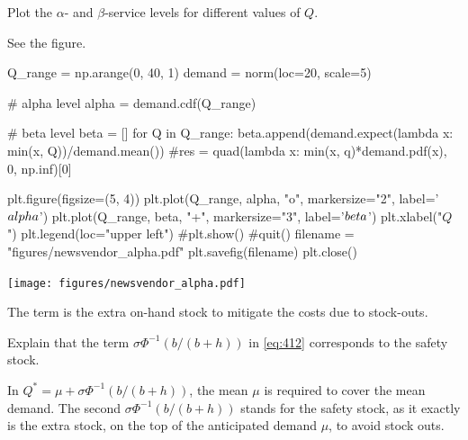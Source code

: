 \begin{exercise}[Continuation]
Plot the $\alpha$- and $\beta$-service levels for different values of $Q$.
\begin{solution}
See the figure.

\begin{pycode}[news]
Q_range = np.arange(0, 40, 1)
demand = norm(loc=20, scale=5)

# alpha level
alpha = demand.cdf(Q_range)

# beta level 
beta = []
for Q in Q_range:
    beta.append(demand.expect(lambda x: min(x, Q))/demand.mean())
    #res = quad(lambda x: min(x, q)*demand.pdf(x), 0, np.inf)[0]


plt.figure(figsize=(5, 4))
plt.plot(Q_range, alpha, "o", markersize="2", label='$\\alpha$')
plt.plot(Q_range, beta, "+", markersize="3", label='$\\beta$')
plt.xlabel("$Q$")
plt.legend(loc="upper left")
#plt.show()
#quit()
filename = "figures/newsvendor_alpha.pdf"
plt.savefig(filename)
plt.close()
\end{pycode}

\begin{center}
\texttt{[image: figures/newsvendor\_alpha.pdf]}
\end{center}
\end{solution}
\end{exercise}


The term  is the extra on-hand stock to mitigate the costs due to stock-outs. 

\begin{exercise}
Explain that the term $\sigma \Phi^{-1}(b/(b+h))$ in \eqref{eq:412} corresponds to the  safety stock.
\begin{solution}
In $Q^* = \mu + \sigma \Phi^{-1}(b/(b+h))$, the mean $\mu$ is required to cover the mean demand. The second $\sigma \Phi^{-1}(b/(b+h))$ stands for the safety stock, as it exactly is the extra stock, on the top of the anticipated demand $\mu$, to avoid stock outs.
\end{solution}
\end{exercise}

